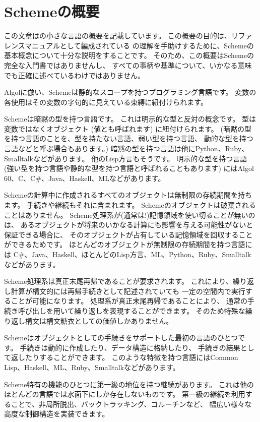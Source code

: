 \chapter*{Schemeの概要}

この文章は\rsevenrs{}の小さな言語の概要を記載しています。
この概要の目的は、リファレンスマニュアルとして編成されている
\rsevenrs{}の理解を手助けするために、Schemeの基本概念について十分な説明をすることです。
そのため、この概要はSchemeの完全な入門書ではありませんし、
すべての事柄や基準について、いかなる意味でも正確に述べているわけではありません。

\vest Algolに倣い、Schemeは静的なスコープを持つプログラミング言語です。
変数の各使用はその変数の字句的に見えている束縛に紐付けられます。

\vest Schemeは暗黙の型を持つ言語です。
これは明示的な型と反対の概念です。
型は変数ではなくオブジェクト (値とも呼ばれます) に紐付けられます。
(暗黙の型を持つ言語のことを、型を持たない言語、弱い型を持つ言語、
動的な型を持つ言語などと呼ぶ場合もあります。)
暗黙の型を持つ言語は他にPython、Ruby、Smalltalkなどがあります。
他のLisp方言もそうです。
明示的な型を持つ言語
(強い型を持つ言語や静的な型を持つ言語と呼ばれることもあります)
にはAlgol 60、C、C\#、Java、Haskell、MLなどがあります。

\vest Schemeの計算中に作成されるすべてのオブジェクトは無制限の存続期間を持ちます。
手続きや継続もそれに含まれます。
Schemeのオブジェクトは破棄されることはありません。
Scheme処理系が(通常は!)記憶領域を使い切ることが無いのは、
あるオブジェクトが将来のいかなる計算にも影響を与える可能性がないと保証できる場合に、
そのオブジェクトが占有している記憶領域を回収することができるためです。
ほとんどのオブジェクトが無制限の存続期間を持つ言語には
C\#、Java、Haskell、ほとんどのLisp方言、ML、Python、Ruby、Smalltalkなどがあります。

Scheme処理系は真正末尾再帰であることが要求されます。
これにより、繰り返し計算が構文的には再帰手続きとして記述されていても
一定の空間内で実行することが可能になります。
処理系が真正末尾再帰であることにより、
通常の手続き呼び出しを用いて繰り返しを表現することができます。
そのため特殊な繰り返し構文は構文糖衣としての価値しかありません。

\vest Schemeはオブジェクトとしての手続きをサポートした最初の言語のひとつです。
手続きは動的に作成したり、データ構造に格納したり、
手続きの結果として返したりすることができます。
このような特徴を持つ言語にはCommon Lisp、Haskell、ML、Ruby、Smalltalkなどがあります。

\vest Scheme特有の機能のひとつに第一級の地位を持つ継続があります。
これは他のほとんどの言語では水面下にしか存在しないものです。
第一級の継続を利用することで、非局所脱出、バックトラッキング、コルーチンなど、
幅広い様々な高度な制御構造を実装できます。

